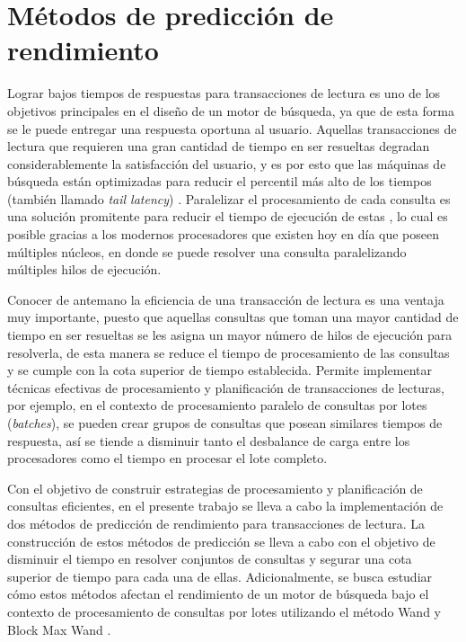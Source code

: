 \chapter{Métodos de predicción de rendimiento}
\label{cap:prediccion}
Lograr bajos tiempos de respuestas para transacciones de lectura es uno de los objetivos principales en el diseño de un motor de búsqueda, ya que de esta forma se le puede entregar una respuesta oportuna al usuario. Aquellas transacciones de lectura que requieren una gran cantidad de tiempo en ser resueltas degradan considerablemente la satisfacción del usuario, y es por esto que las máquinas de búsqueda están optimizadas para reducir el percentil más alto de los tiempos (también llamado \textit{tail latency}) \citep{Jeon:2014}. Paralelizar el procesamiento de cada consulta es una solución promitente para reducir el tiempo de ejecución de estas \citep{Jeon:2013, Tatikonda:2011}, lo cual es posible gracias a los modernos procesadores que existen hoy en día que poseen múltiples núcleos, en donde se puede resolver una consulta paralelizando múltiples hilos de ejecución.

Conocer de antemano la eficiencia de una transacción de lectura es una ventaja muy importante, puesto que aquellas consultas que toman una mayor cantidad de tiempo en ser resueltas se les asigna un mayor número de hilos de ejecución para resolverla, de esta manera se reduce el tiempo de procesamiento de las consultas y se cumple con la cota superior de tiempo establecida. Permite implementar técnicas efectivas de procesamiento y planificación de transacciones de lecturas, por ejemplo, en el contexto de procesamiento paralelo de consultas por lotes (\textit{batches}), se pueden crear grupos de consultas que posean similares tiempos de respuesta, así se tiende a disminuir tanto el desbalance de carga entre los procesadores como el tiempo en procesar el lote completo.

Con el objetivo de construir estrategias de procesamiento y planificación de consultas eficientes, en el presente trabajo se lleva a cabo la implementación de dos métodos de predicción de rendimiento para transacciones de lectura. La construcción de estos métodos de predicción se lleva a cabo con el objetivo de disminuir el tiempo en resolver conjuntos de consultas y segurar una cota superior de tiempo para cada una de ellas. Adicionalmente, se busca estudiar cómo estos métodos afectan el rendimiento de un motor de búsqueda bajo el contexto de procesamiento de consultas por lotes utilizando el método Wand \citep{Broder:2003} y Block Max Wand \citep{Ding:2011}.

